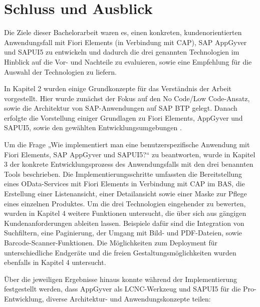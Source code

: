 
\chapter{Schluss und Ausblick}

Die Ziele dieser Bachelorarbeit waren es, einen konkreten, kundenorientierten Anwendungsfall mit Fiori Elements (in Verbindung mit CAP), SAP AppGyver und SAPUI5 zu entwickeln und dadurch die drei genannten Technologien im Hinblick auf die Vor- und Nachteile zu evaluieren, sowie eine Empfehlung für die Auswahl der Technologien zu liefern.

In Kapitel 2 wurden einige Grundkonzepte für das Verständnis der Arbeit vorgestellt. Hier wurde zunächst der Fokus auf den No Code/Low Code-Ansatz, sowie die Architektur von SAP-Anwendungen auf SAP BTP gelegt. Danach erfolgte die Vorstellung einiger Grundlagen zu Fiori Elements, AppGyver und SAPUI5, sowie den gewählten Entwicklungsumgebungen .

Um die Frage „Wie implementiert man eine benutzerspezifische Anwendung mit Fiori Elements, SAP AppGyver und SAPUI5?“ zu beantworten, wurde in Kapitel 3 der konkrete Entwicklungsprozess des Anwendungsfalls mit den drei benannten Tools beschrieben. Die Implementierungsschritte umfassten die Bereitstellung eines OData-Services mit Fiori Elements in Verbindung mit CAP im BAS, die Erstellung einer Listenansicht, einer Detailansicht sowie einer Maske zur Pflege eines einzelnen Produktes. Um die drei Technologien eingehender zu bewerten, wurden in Kapitel 4 weitere Funktionen untersucht, die über sich aus gängigen Kundenanforderungen ableiten lassen. Beispiele dafür sind die Integration von Suchfiltern, eine Paginierung, der Umgang mit Bild- und PDF-Dateien, sowie Barcode-Scanner-Funktionen. Die Möglichkeiten zum Deployment für unterschiedliche Endgeräte und die freien Gestaltungsmöglichkeiten wurden ebenfalls in Kapitel 4 untersucht. 

Über die jeweiligen Ergebnisse hinaus konnte während der Implementierung festgestellt werden, dass AppGyver als LCNC-Werkzeug und SAPUI5 für die Pro-Entwicklung, diverse Architektur- und Anwendungskonzepte teilen:

